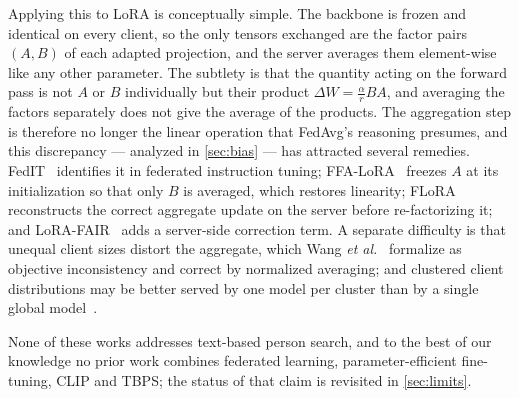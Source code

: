 Applying this to LoRA is conceptually simple. The backbone is frozen and identical on every client, so the only tensors exchanged are the factor pairs $(A,B)$ of each adapted projection, and the server averages them element-wise like any other parameter. The subtlety is that the quantity acting on the forward pass is not $A$ or $B$ individually but their product $\Delta W=\tfrac{\alpha}{r}BA$, and averaging the factors separately does not give the average of the products. The aggregation step is therefore no longer the linear operation that FedAvg's reasoning presumes, and this discrepancy --- analyzed in \cref{sec:bias} --- has attracted several remedies. FedIT~\citep{zhang2024buildingfederatedgptfederated} identifies it in federated instruction tuning; FFA-LoRA~\citep{sun2024improvingloraprivacypreservingfederated} freezes $A$ at its initialization so that only $B$ is averaged, which restores linearity; FLoRA~\citep{wang2024florafederatedfinetuninglarge} reconstructs the correct aggregate update on the server before re-factorizing it; and LoRA-FAIR~\citep{bian2025lorafairfederatedlorafinetuning} adds a server-side correction term. A separate difficulty is that unequal client sizes distort the aggregate, which Wang \textit{et al.}~\citep{wang2020tacklingobjectiveinconsistencyproblem} formalize as objective inconsistency and correct by normalized averaging; and clustered client distributions may be better served by one model per cluster than by a single global model~\citep{sattler2019clusteredfederatedlearningmodelagnostic,ghosh2021efficientframeworkclusteredfederated}.

None of these works addresses text-based person search, and to the best of our knowledge no prior work combines federated learning, parameter-efficient fine-tuning, CLIP and TBPS; the status of that claim is revisited in \cref{sec:limits}.

